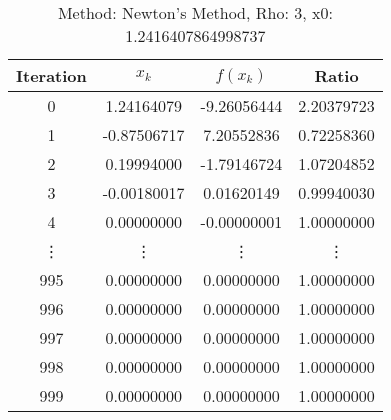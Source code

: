 \begin{table}
\centering
\caption{Method: Newton's Method, Rho: 3, x0: 1.2416407864998737}
\label{tab:table_Newton's_Method_3_1_2416407864998737}
\begin{tabular}{c c c c}
\toprule
Iteration &       $x_k$ &    $f(x_k)$ &      Ratio \\
\midrule
        0 &  1.24164079 & -9.26056444 & 2.20379723 \\
        1 & -0.87506717 &  7.20552836 & 0.72258360 \\
        2 &  0.19994000 & -1.79146724 & 1.07204852 \\
        3 & -0.00180017 &  0.01620149 & 0.99940030 \\
        4 &  0.00000000 & -0.00000001 & 1.00000000 \\
   \vdots &      \vdots &      \vdots &     \vdots \\
      995 &  0.00000000 &  0.00000000 & 1.00000000 \\
      996 &  0.00000000 &  0.00000000 & 1.00000000 \\
      997 &  0.00000000 &  0.00000000 & 1.00000000 \\
      998 &  0.00000000 &  0.00000000 & 1.00000000 \\
      999 &  0.00000000 &  0.00000000 & 1.00000000 \\
\bottomrule
\end{tabular}
\end{table}
